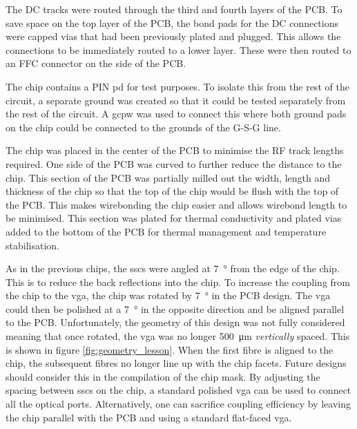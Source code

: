 The DC tracks were routed through the third and fourth layers of the PCB. To save space on the top layer of the PCB, the bond pads for the DC connections were capped vias that had been previously plated and plugged. This allows the connections to be immediately routed to a lower layer. These were then routed to an FFC connector on the side of the PCB.

The chip contains a PIN \ac{pd} for test purposes. To isolate this from the rest of the circuit, a separate ground was created so that it could be tested separately from the rest of the circuit. A \ac{gcpw} was used to connect this where both ground pads on the chip could be connected to the grounds of the G-S-G line.


The chip was placed in the center of the PCB to minimise the RF track lengths required. One side of the PCB was curved to further reduce the distance to the chip. This section of the PCB was partially milled out the width, length and thickness of the chip so that the top of the chip would be flush with the top of the PCB. This makes wirebonding the chip easier and allows wirebond length to be minimised. This section was plated for thermal conductivity and plated vias added to the bottom of the PCB for thermal management and temperature stabilisation. 

As in the previous chips, the \acp{ssc} were angled at \SI{7}{\degree} from the edge of the chip. This is to reduce the back reflections into the chip. To increase the coupling from the chip to the \ac{vga}, the chip was rotated by \SI{7}{\degree} in the PCB design. The \ac{vga} could then be polished at a \SI{7}{\degree} in the opposite direction and be aligned parallel to the PCB. Unfortunately, the geometry of this design was not fully considered meaning that once rotated, the \ac{vga} was no longer \SI{500}{\um} \textit{vertically} spaced. This is shown in figure \ref{fig:geometry_lesson}. When the first fibre is aligned to the chip, the subsequent fibres no longer line up with the chip facets. Future designs should consider this in the compilation of the chip mask. By adjusting the spacing between \acp{ssc} on the chip, a standard polished \ac{vga} can be used to connect all the optical ports. Alternatively, one can sacrifice coupling efficiency by leaving the chip parallel with the PCB and using a standard flat-faced \ac{vga}.

